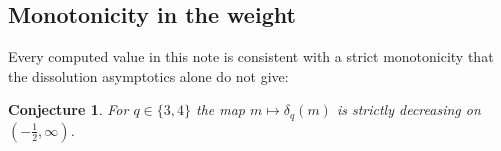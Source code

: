 \newtheorem{remark}{Remark}
\newtheorem{conjecture}{Conjecture}
%
\subsection*{Monotonicity in the weight}\label{subsec:monotone}

Every computed value in this note is consistent with a strict
monotonicity that the dissolution asymptotics alone do not give:

\begin{conjecture}\label{conj:monotone}
For $q\in\{3,4\}$ the map $m\mapsto\delta_q(m)$ is strictly decreasing
on $(-\tfrac12,\infty)$.
\end{conjecture}

